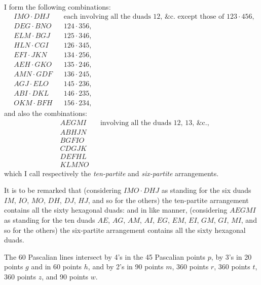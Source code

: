 \documentclass[11pt,a4paper]{article}
\theoremstyle{definition}
\begin{document}
I form the following combinations:
\begin{align*}
&IMO \cdot DHJ && \text{each involving all the duads 12, \&c.\ except those of } 123 \cdot 456,\\
&DEG \cdot BNO && 124 \cdot 356,\\
&ELM \cdot BGJ && 125 \cdot 346,\\
&HLN \cdot CGI && 126 \cdot 345,\\
&EFI \cdot JKN && 134 \cdot 256,\\
&AEH \cdot GKO && 135 \cdot 246,\\
&AMN \cdot GDF && 136 \cdot 245,\\
&AGJ \cdot ELO && 145 \cdot 236,\\
&ABI \cdot DKL && 146 \cdot 235,\\
&OKM \cdot BFH && 156 \cdot 234,
\end{align*}
and also the combinations:
\begin{align*}
&AEGMI && \text{involving all the duads 12, 13, \&c.,}\\
&ABHJN\\
&BGFIO\\
&CDGJK\\
&DEFHL\\
&KLMNO
\end{align*}
which I call respectively the \textit{ten-partite} and \textit{six-partite} arrangements.

It is to be remarked that (considering $IMO \cdot DHJ$ as standing for the six duads $IM$, $IO$, $MO$, $DH$, $DJ$, $HJ$, and so for the others) the ten-partite arrangement contains all the sixty hexagonal duads: and in like manner, (considering $AEGMI$ as standing for the ten duads $AE$, $AG$, $AM$, $AI$, $EG$, $EM$, $EI$, $GM$, $GI$, $MI$, and so for the others) the six-partite arrangement contains all the sixty hexagonal duads.

The 60 Pascalian lines intersect by 4's in the 45 Pascalian points $p$, by 3's in 20 points $g$ and in 60 points $h$, and by 2's in 90 points $m$, 360 points $r$, 360 points $t$, 360 points $z$, and 90 points $w$.
\end{document}

